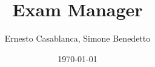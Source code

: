 \documentclass[12pt]{article}
\begin{document}
\title{Exam Manager}
\author{Ernesto Casablanca, Simone Benedetto}
\date{\today}
\makeatletter



\tableofcontents
\newpage


\pagebreak


\pagebreak


\pagebreak

\printglossary
\pagebreak
\printbibliography
\pagebreak


\end{document}

